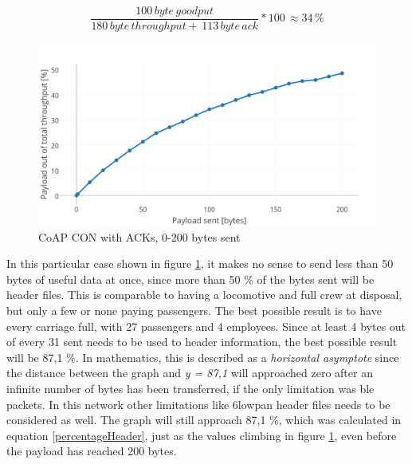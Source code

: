  

\begin{equation} \label{eqCON100byte2}
    \frac{100 \, byte \, goodput}{180 \, byte \, throughput + \, 113 \, byte \, ack}*100 \, \approx 34 \,\%
\end{equation}


\begin{figure}[ht]
    \centering
    \includegraphics[width=1.0\textwidth]{CON0-200withAcks.png}    
    \caption{CoAP CON with ACKs, 0-200 bytes sent}
    \label{fig:coapCON0200}
\end{figure}

\noindent In this particular case shown in figure \ref{fig:coapCON0200}, it makes no sense to send less than 50 bytes of useful data at once, since more than 50 \% of the bytes sent will be header files. This is comparable to having a locomotive and full crew at disposal, but only a few or none paying passengers. The best possible result is to have every carriage full, with 27 passengers and 4 employees. Since at least 4 bytes out of every 31 sent needs to be used to header information, the best possible result will be 87,1 \%. In mathematics, this is described as a \textit{horizontal asymptote} since the distance between the graph and \textit{y = 87,1} will approached zero after an infinite number of bytes has been transferred, if the only limitation was \gls{ble} packets. In this network other limitations like \gls{6lowpan} header files needs to be considered as well. The graph will still approach 87,1 \%, which was calculated in equation \ref{percentageHeader}, just as the values climbing in figure \ref{fig:coapCON0200}, even before the \gls{payload} has reached 200 bytes.


